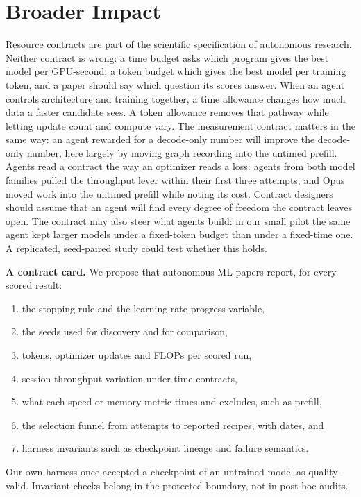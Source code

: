 \documentclass{article}
\begin{document}
\clearpage
\section{Broader Impact}\label{partthree}
Resource contracts are part of the scientific specification of autonomous research. Neither contract is wrong: a time budget asks which program gives the best model per GPU-second, a token budget which gives the best model per training token, and a paper should say which question its scores answer. When an agent controls architecture and training together, a time allowance changes how much data a faster candidate sees. A token allowance removes that pathway while letting update count and compute vary. The measurement contract matters in the same way: an agent rewarded for a decode-only number will improve the decode-only number, here largely by moving graph recording into the untimed prefill. Agents read a contract the way an optimizer reads a loss: agents from both model families pulled the throughput lever within their first three attempts, and Opus moved work into the untimed prefill while noting its cost. Contract designers should assume that an agent will find every degree of freedom the contract leaves open. The contract may also steer what agents build: in our small pilot the same agent kept larger models under a fixed-token budget than under a fixed-time one. A replicated, seed-paired study could test whether this holds.

\textbf{A contract card.} We propose that autonomous-ML papers report, for every scored result:
{\setlength{\leftmargini}{1.6em}\begin{enumerate}\setlength{\itemsep}{0pt}\setlength{\parskip}{0pt}\setlength{\topsep}{2pt}
\item the stopping rule and the learning-rate progress variable,
\item the seeds used for discovery and for comparison,
\item tokens, optimizer updates and FLOPs per scored run,
\item session-throughput variation under time contracts,
\item what each speed or memory metric times and excludes, such as prefill,
\item the selection funnel from attempts to reported recipes, with dates, and
\item harness invariants such as checkpoint lineage and failure semantics.
\end{enumerate}}
\noindent Our own harness once accepted a checkpoint of an untrained model as quality-valid. Invariant checks belong in the protected boundary, not in post-hoc audits.
\end{document}
